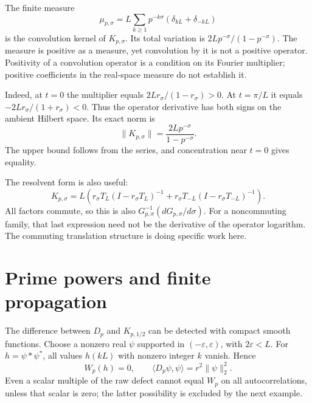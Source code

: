 \documentclass[11pt,letterpaper]{article}
\theoremstyle{definition}
\theoremstyle{remark}
\begin{document}
The finite measure
\begin{equation}\label{eq:kernel-measure}
 \mu_{p,\sigma}=L\sum_{k\ge1}p^{-k\sigma}
                     (\delta_{kL}+\delta_{-kL})
\end{equation}
is the convolution kernel of $K_{p,\sigma}$. Its total variation is
$2Lp^{-\sigma}/(1-p^{-\sigma})$. The measure is positive as a
measure, yet convolution by it is not a positive operator. Positivity
of a convolution operator is a condition on its Fourier multiplier;
positive coefficients in the real-space measure do not establish it.

Indeed, at $t=0$ the multiplier equals
$2Lr_\sigma/(1-r_\sigma)>0$. At $t=\pi/L$ it equals
$-2Lr_\sigma/(1+r_\sigma)<0$. Thus the operator derivative has both
signs on the ambient Hilbert space. Its exact norm is
\begin{equation}\label{eq:K-norm}
 \|K_{p,\sigma}\|=\frac{2Lp^{-\sigma}}{1-p^{-\sigma}}.
\end{equation}
The upper bound follows from the series, and concentration near
$t=0$ gives equality.

The resolvent form is also useful:
\begin{equation}\label{eq:K-resolvent}
 K_{p,\sigma}=L\left(r_\sigma T_L(I-r_\sigma T_L)^{-1}
             +r_\sigma T_{-L}(I-r_\sigma T_{-L})^{-1}\right).
\end{equation}
All factors commute, so this is also
$G_{p,\sigma}^{-1}(dG_{p,\sigma}/d\sigma)$. For a noncommuting
family, that last expression need not be the derivative of the
operator logarithm. The commuting translation structure is doing
specific work here.

\section{Prime powers and finite propagation}

The difference between $D_p$ and $K_{p,1/2}$ can be detected with
compact smooth functions. Choose a nonzero real $\psi$ supported
in $(-\varepsilon,\varepsilon)$, with $2\varepsilon<L$.
For $h=\psi*\psi^*$, all values $h(kL)$ with nonzero integer $k$
vanish. Hence
\begin{equation}\label{eq:short-bump-comparison}
 W_p(h)=0,\qquad \langle D_p\psi,\psi\rangle=r^2\|\psi\|_2^2.
\end{equation}
Even a scalar multiple of the raw defect cannot equal $W_p$ on all
autocorrelations, unless that scalar is zero; the latter possibility
is excluded by the next example.
\end{document}
